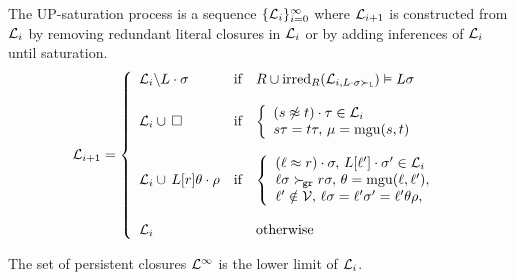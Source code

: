     \begin{definition}[UP-Saturation]

            The UP-{saturation process}
            is a sequence \( \{ \mathcal{L}_i \}_{i=0}^\infty \)
            where \(\mathcal{L}_{i+1}\) is constructed from \(\mathcal{L}_i\)
            by removing redundant literal closures in \(\mathcal{L}_i\)
            or by adding inferences of \(\mathcal{L}_i\) until saturation.
            \begin{gather*}
            \mathcal{L}_{i+1} = \left\{
                    \begin{array}{lclc}
                        \mathcal{L}_i \backslash L\cdot\sigma
                        &\text{if}
                        &R \cup \operatorname{irred}_R(\mathcal{L}_{i,L\cdot\sigma\mathrel\succ_{\mathtt{L}}}) \vDash L\sigma
                        \\
                        \\
                        \mathcal{L}_i \cup\,\square
                        &\text{if}
                        &\left\{\begin{array}{l}
                            (s\not\approx t)\cdot\tau\in\mathcal{L}_i
                            \\
                            s\tau = t\tau,\,
                            \mu=\operatorname{mgu}(s,t)
                        \end{array}\right.
                        \\
                        \\
                        \mathcal{L}_i \cup\, L[r]\theta\cdot\rho
                        &\text{if}
                        &\left\{\begin{array}{l}
                            (\ell\approx r)\cdot\sigma,\,
                            L[\ell']\cdot\sigma'\in\mathcal{L}_i
                            \\
                            \ell\sigma\mathrel\succ_{\!\mathtt{gr}} r\sigma,\,
                            \theta=\operatorname{mgu}(\ell,\ell'),
                            \\
                            \ell'\notin\mathcal{V},\,
                            \ell\sigma = \ell'\sigma' = \ell'\theta\rho,
                        \end{array}\right.
                        \\
                        \\
                        \mathcal{L}_i
                        &&\text{otherwise}
                    \end{array}
                \right.
                \end{gather*}

            The set of persistent closures \( \mathcal{L}^\infty \) is the lower limit of \(\mathcal{L}_i\).

    \end{definition}
